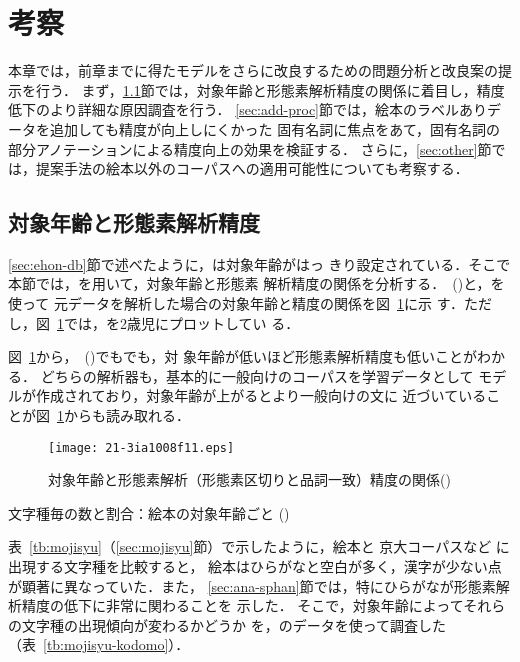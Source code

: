 \documentclass[japanese]{jnlp_1.4}
\newcommand{\kodomo}{}
\newcommand{\kod}[1]{}
\newcommand{\mecab}{}
\newcommand{\kytea}{}
\newcommand{\bestHINOKI}{}
\begin{document}
\section{考察}
\label{sec:kousatsu}


本章では，前章までに得たモデルをさらに改良するための問題分析と改良案の提示を行う．
まず，\ref{sec:age-acc}節では，対象年齢と形態素解析精度の関係に着目し，精度低下のより詳細な原因調査を行う．
\ref{sec:add-proc}節では，絵本のラベルありデータを追加しても精度が向上しにくかった
固有名詞に焦点をあて，固有名詞の部分アノテーションによる精度向上の効果を検証する．
さらに，\ref{sec:other}節では，提案手法の絵本以外のコーパスへの適用可能性についても考察する．


\subsection{対象年齢と形態素解析精度}
\label{sec:age-acc}

\ref{sec:ehon-db}節で述べたように，\kodomo は対象年齢がはっ
きり設定されている．そこで本節では，\kodomo を用いて，対象年齢と形態素
解析精度の関係を分析する．\kytea\ (\bestHINOKI)と，\mecab を使って
元データを解析した場合の対象年齢と精度の関係を図~\ref{fig:age-acc}に示
す．ただし，図~\ref{fig:age-acc}では，\kod{012}を2歳児にプロットしてい
る．

 図~\ref{fig:age-acc}から，\kytea\ (\bestHINOKI)でも\mecab でも，対
 象年齢が低いほど形態素解析精度も低いことがわかる．
どちらの解析器も，基本的に一般向けのコーパスを学習データとして
モデルが作成されており，対象年齢が上がるとより一般向けの文に
近づいていることが図~\ref{fig:age-acc}からも読み取れる．

 \begin{figure}[b]
   \begin{center}
    \texttt{[image: 21-3ia1008f11.eps]}
   \end{center}
 \caption{対象年齢と形態素解析（形態素区切りと品詞一致）精度の関係(\kodomo)}
  \label{fig:age-acc}
 \end{figure}
\begin{table}[b]
\caption{文字種毎の数と割合：絵本の対象年齢ごと (\kodomo)}
\label{tb:mojisyu-kodomo}

\end{table}


表~\ref{tb:mojisyu}（\ref{sec:mojisyu}節）で示したように，絵本と
京大コーパスなど
に出現する文字種を比較すると，
絵本はひらがなと空白が多く，漢字が少ない点が顕著に異なっていた．また，
\ref{sec:ana-sphan}節では，特にひらがなが形態素解析精度の低下に非常に関わることを
示した．
そこで，対象年齢によってそれらの文字種の出現傾向が変わるかどうか
を，\kodomo のデータを使って調査した（表~\ref{tb:mojisyu-kodomo}）．
\end{document}
